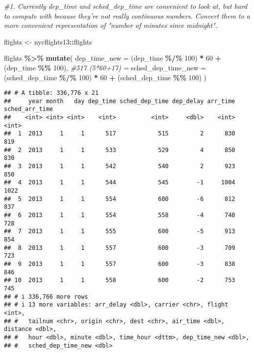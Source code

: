 \documentclass[
]{article}
\newenvironment{Shaded}{\begin{snugshade}}{\end{snugshade}}
\newcommand{\AttributeTok}[1]{\textcolor[rgb]{0.13,0.29,0.53}{#1}}
\newcommand{\CommentTok}[1]{\textcolor[rgb]{0.56,0.35,0.01}{\textit{#1}}}
\newcommand{\DecValTok}[1]{\textcolor[rgb]{0.00,0.00,0.81}{#1}}
\newcommand{\FunctionTok}[1]{\textcolor[rgb]{0.13,0.29,0.53}{\textbf{#1}}}
\newcommand{\NormalTok}[1]{#1}
\newcommand{\OtherTok}[1]{\textcolor[rgb]{0.56,0.35,0.01}{#1}}
\newcommand{\SpecialCharTok}[1]{\textcolor[rgb]{0.81,0.36,0.00}{\textbf{#1}}}
\begin{document}
\begin{Shaded}
\begin{Highlighting}[]
\CommentTok{\#1. Currently dep\_time and sched\_dep\_time are convenient to look at, but hard to compute with because they’re not really continuous numbers. Convert them to a more convenient representation of "number of minutes since midnight".}

\NormalTok{flights }\OtherTok{\textless{}{-}}\NormalTok{ nycflights13}\SpecialCharTok{::}\NormalTok{flights}

\NormalTok{flights }\SpecialCharTok{\%\textgreater{}\%} \FunctionTok{mutate}\NormalTok{(}
                    \AttributeTok{dep\_time\_new =}\NormalTok{ (dep\_time }\SpecialCharTok{\%/\%} \DecValTok{100}\NormalTok{) }\SpecialCharTok{*} \DecValTok{60} \SpecialCharTok{+}\NormalTok{ (dep\_time }\SpecialCharTok{\%\%} \DecValTok{100}\NormalTok{), }\CommentTok{\#517 (5*60+17) = }
                    \AttributeTok{sched\_dep\_time\_new =}\NormalTok{ (sched\_dep\_time }\SpecialCharTok{\%/\%} \DecValTok{100}\NormalTok{) }\SpecialCharTok{*} \DecValTok{60} \SpecialCharTok{+}\NormalTok{ (sched\_dep\_time }\SpecialCharTok{\%\%} \DecValTok{100}\NormalTok{)}
\NormalTok{                  )}
\end{Highlighting}
\end{Shaded}

\begin{verbatim}
## # A tibble: 336,776 x 21
##     year month   day dep_time sched_dep_time dep_delay arr_time sched_arr_time
##    <int> <int> <int>    <int>          <int>     <dbl>    <int>          <int>
##  1  2013     1     1      517            515         2      830            819
##  2  2013     1     1      533            529         4      850            830
##  3  2013     1     1      542            540         2      923            850
##  4  2013     1     1      544            545        -1     1004           1022
##  5  2013     1     1      554            600        -6      812            837
##  6  2013     1     1      554            558        -4      740            728
##  7  2013     1     1      555            600        -5      913            854
##  8  2013     1     1      557            600        -3      709            723
##  9  2013     1     1      557            600        -3      838            846
## 10  2013     1     1      558            600        -2      753            745
## # i 336,766 more rows
## # i 13 more variables: arr_delay <dbl>, carrier <chr>, flight <int>,
## #   tailnum <chr>, origin <chr>, dest <chr>, air_time <dbl>, distance <dbl>,
## #   hour <dbl>, minute <dbl>, time_hour <dttm>, dep_time_new <dbl>,
## #   sched_dep_time_new <dbl>
\end{verbatim}
\end{document}
